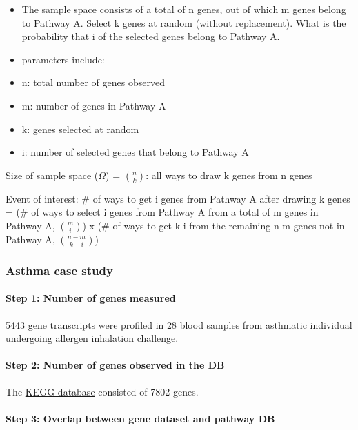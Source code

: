 \documentclass[]{book}
\providecommand{\tightlist}{%
  \setlength{\itemsep}{0pt}\setlength{\parskip}{0pt}}
\let\oldparagraph\paragraph
\renewcommand{\paragraph}[1]{\oldparagraph{#1}\mbox{}}
\begin{document}
\begin{itemize}
\tightlist
\item
  The sample space consists of a total of n genes, out of which m genes
  belong to Pathway A. Select k genes at random (without replacement).
  What is the probability that i of the selected genes belong to Pathway
  A.
\item
  parameters include:
\item
  n: total number of genes observed
\item
  m: number of genes in Pathway A
\item
  k: genes selected at random
\item
  i: number of selected genes that belong to Pathway A
\end{itemize}

Size of sample space (\(\Omega \)) = \(n \choose k \): all ways to draw
k genes from n genes

Event of interest: \# of ways to get i genes from Pathway A after
drawing k genes = (\# of ways to select i genes from Pathway A from a
total of m genes in Pathway A, \(m \choose i \)) x (\# of ways to get
k-i from the remaining n-m genes not in Pathway A, \(n-m \choose k-i \))

\subsubsection{Asthma case study}\label{asthma-case-study}

\paragraph{Step 1: Number of genes
measured}\label{step-1-number-of-genes-measured}

5443 gene transcripts were profiled in 28 blood samples from asthmatic
individual undergoing allergen inhalation challenge.

\paragraph{Step 2: Number of genes observed in the
DB}\label{step-2-number-of-genes-observed-in-the-db}

The
\href{https://github.com/singha53/omicsCentralDatasets/blob/master/inst/extdata/dataCleaning/pathwayDB/pathways.md}{KEGG
database} consisted of 7802 genes.

\paragraph{Step 3: Overlap between gene dataset and pathway
DB}\label{step-3-overlap-between-gene-dataset-and-pathway-db}
\end{document}

